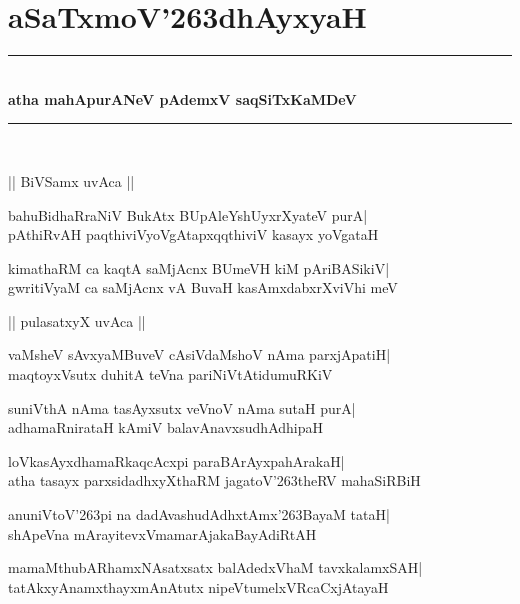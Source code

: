 \documentclass[twoside,12pt,openright]{book}
\def\S{\char'263}
\newcounter{shloka}[chapter]
\begin{document}
\chapter{aSaTxmoV\S dhAyxyaH}
\begin{center}
\rule{2cm}{1pt}\\[.5cm]
{\LARGE\bfseries atha mahApurANeV pAdemxV saqSiTxKaMDeV}\\[.3cm]
\rule{2cm}{1pt}\\
\end{center}

\begin{center}
|| BiVSamx uvAca ||
\end{center}
\begin{shloka}%
bahuBidhaRraNiV BukAtx BUpAleYshUyxrXyateV purA|\\
pAthiRvAH paqthiviVyoVgAtapxqqthiviV kasayx yoVgataH
\end{shloka}

\begin{shloka}%
kimathaRM ca kaqtA saMjAcnx BUmeVH kiM pAriBASikiV|\\
gwritiVyaM ca saMjAcnx vA BuvaH kasAmxdabxrXviVhi meV
\end{shloka}

\begin{center}
|| pulasatxyX uvAca ||
\end{center}
\begin{shloka}%
vaMsheV sAvxyaMBuveV cAsiVdaMshoV nAma parxjApatiH|\\
maqtoyxVsutx duhitA teVna pariNiVtAtidumuRKiV
\end{shloka}

\begin{shloka}%
suniVthA nAma tasAyxsutx veVnoV nAma sutaH purA|\\
adhamaRnirataH kAmiV balavAnavxsudhAdhipaH
\end{shloka}

\begin{shloka}%
loVkasAyxdhamaRkaqcAcxpi paraBArAyxpahArakaH|\\
atha tasayx parxsidadhxyXthaRM jagatoV\S theRV mahaSiRBiH
\end{shloka}

\begin{shloka}%
anuniVtoV\S pi na dadAvashudAdhxtAmx\S BayaM tataH|\\
shApeVna mArayitevxVmamarAjakaBayAdiRtAH
\end{shloka}

\begin{shloka}%
mamaMthubARhamxNAsatxsatx balAdedxVhaM tavxkalamxSAH|\\
tatAkxyAnamxthayxmAnAtutx nipeVtumelxVRcaCxjAtayaH
\end{shloka}
\end{document}
